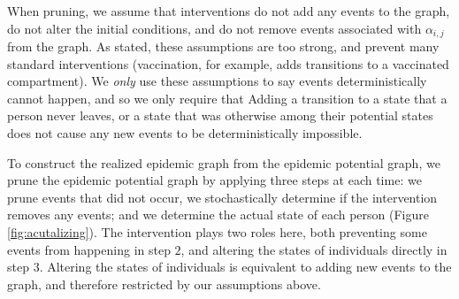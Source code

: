 \documentclass[PTRSB]{rsos}
\begin{document}
\begin{multicols}{2}
When pruning, we assume that interventions do not add any events to the graph, do not alter the initial conditions, and do not remove events associated with $\alpha_{i,j}$ from the graph.
As stated, these assumptions are too strong, and prevent many standard interventions (vaccination, for example, adds transitions to a vaccinated compartment).
We \emph{only} use these assumptions to say events deterministically cannot happen, and so we only require that 
Adding a transition to a state that a person never leaves, or a state that was otherwise among their potential states does not cause any new events to be deterministically impossible.

To construct the realized epidemic graph from the epidemic potential graph, we prune the epidemic potential graph by applying three steps at each time: we prune events that did not occur, we stochastically determine if the intervention removes any events; and we determine the actual state of each person (Figure \ref{fig:acutalizing}).
The intervention plays two roles here, both preventing some events from happening in step $2$, and altering the states of individuals directly in step $3$.
Altering the states of individuals is equivalent to adding new events to the graph, and therefore restricted by our assumptions above.


\end{multicols}
\end{document}
